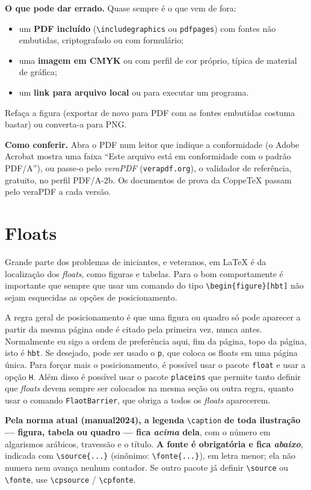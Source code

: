 \documentclass[dsc,setavermelha]{ufrj}
\theoremstyle{plain}
\theoremstyle{definition}
\theoremstyle{remark}
\begin{document}
\textbf{O que pode dar errado.} Quase sempre é o que vem de fora:
\begin{itemize}
  \item um \textbf{PDF incluído} (\verb|\includegraphics| ou \verb|pdfpages|) com fontes não embutidas, criptografado ou com formulário;
  \item uma \textbf{imagem em CMYK} ou com perfil de cor próprio, típica de material de gráfica;
  \item um \textbf{link para arquivo local} ou para executar um programa.
\end{itemize}
Refaça a figura (exportar de novo para PDF com as fontes embutidas costuma bastar) ou converta-a para PNG.

\textbf{Como conferir.} Abra o PDF num leitor que indique a conformidade (o Adobe Acrobat mostra uma faixa ``Este arquivo está em conformidade com o padrão PDF/A''), ou passe-o pelo \emph{veraPDF} (\texttt{verapdf.org}), o validador de referência, gratuito, no perfil PDF/A-2b. Os documentos de prova da CoppeTeX passam pelo veraPDF a cada versão.

\chapter{Floats}

Grande parte dos problemas de iniciantes, e veteranos, em \LaTeX{} é da localização dos \textit{floats}, como figuras e tabelas. Para o bom comportamente é importante que sempre que usar um comando do tipo \verb*|\begin{figure}[hbt]| não sejam esquecidas as opções de posicionamento.

A regra geral de posicionamento é que uma figura ou quadro só pode aparecer a partir da mesma página onde é citado pela primeira vez, nunca antes. Normalmente eu sigo a ordem de preferência aqui, fim da página, topo da página, isto é \verb*|hbt|. Se desejado, pode ser usado o \verb*|p|, que coloca os floats em uma página única. Para forçar mais o posicionamento, é possível usar o pacote \verb*|float| e usar a opção \verb*|H|. Além disso é possível usar o pacote \verb*|placeins| que permite tanto definir que \textit{floats} devem sempre ser colocados na mesma seção ou outra regra, quanto usar o comando \verb*|FlaotBarrier|, que obriga a todos os \textit{floats} aparecerem.

\textbf{Pela norma atual (manual2024), a legenda} \verb|\caption| \textbf{de toda ilustração --- figura, tabela ou quadro --- fica \emph{acima} dela}, com o número em algarismos arábicos, travessão e o título. \textbf{A fonte é obrigatória e fica \emph{abaixo}}, indicada com \verb|\source{...}| (sinônimo: \verb|\fonte{...}|), em letra menor; ela não numera nem avança nenhum contador. Se outro pacote já definir \verb|\source| ou \verb|\fonte|, use \verb|\cpsource| / \verb|\cpfonte|.
\end{document}
